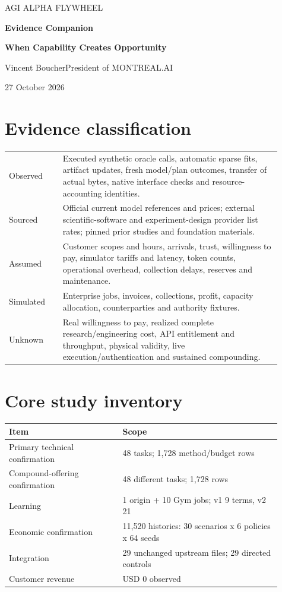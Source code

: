 \documentclass[10pt,letterpaper]{article}
\begin{document}
{\sffamily\color{teal}\large AGI ALPHA FLYWHEEL}\par
{\Huge\bfseries Evidence Companion}\par
\textbf{When Capability Creates Opportunity}\par
Vincent Boucher\quad President of MONTREAL.AI\par
27 October 2026
\section*{Evidence classification}
\begin{longtable}{p{0.18\linewidth}p{0.73\linewidth}}\toprule
Observed & Executed synthetic oracle calls, automatic sparse fits, artifact updates, fresh model/plan outcomes, transfer of actual bytes, native interface checks and resource-accounting identities.\\
Sourced & Official current model references and prices; external scientific-software and experiment-design provider list rates; pinned prior studies and foundation materials.\\
Assumed & Customer scopes and hours, arrivals, trust, willingness to pay, simulator tariffs and latency, token counts, operational overhead, collection delays, reserves and maintenance.\\
Simulated & Enterprise jobs, invoices, collections, profit, capacity allocation, counterparties and authority fixtures.\\
Unknown & Real willingness to pay, realized complete research/engineering cost, API entitlement and throughput, physical validity, live execution/authentication and sustained compounding.\\\bottomrule\end{longtable}
\section*{Core study inventory}
\begin{center}\small\begin{tabular}{p{0.38\linewidth}p{0.53\linewidth}}
\toprule
Item & Scope \\ \midrule
Primary technical confirmation & 48 tasks; 1,728 method/budget rows \\
Compound-offering confirmation & 48 different tasks; 1,728 rows \\
Learning & 1 origin + 10 Gym jobs; v1 9 terms, v2 21 \\
Economic confirmation & 11,520 histories: 30 scenarios x 6 policies x 64 seeds \\
Integration & 29 unchanged upstream files; 29 directed controls \\
Customer revenue & USD 0 observed \\
\bottomrule
\end{tabular}\end{center}
\end{document}
